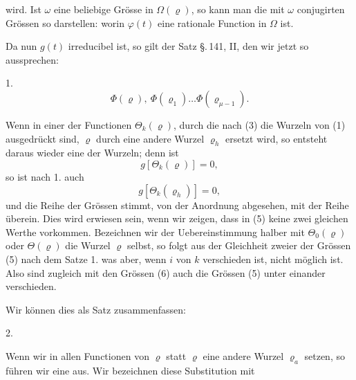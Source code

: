 
wird. Ist $\omega$ eine beliebige Grösse in $\Omega(\varrho)$, so kann man die mit $\omega$ conjugirten Grössen so darstellen:
worin $\varphi(t)$ eine rationale Function in $\Omega$ ist.

Da nun $g(t)$ irreducibel ist, so gilt der Satz \S.\,141, II, den wir jetzt so aussprechen:

1. 
\[
\Phi(\varrho),\ \Phi(\varrho_1) \ldots \Phi(\varrho_{\mu-1}).
\]

Wenn in einer der Functionen $\Theta_k(\varrho)$, durch die nach (3) die Wurzeln von (1) ausgedrückt sind, $\varrho$ durch eine andere Wurzel $\varrho_h$ ersetzt wird, so entsteht daraus wieder eine der Wurzeln; denn ist
\[
g[\Theta_k(\varrho)] = 0,
\]
so ist nach 1. auch
\[
g[\Theta_k(\varrho_h)] = 0,
\]
und die Reihe der Grössen
stimmt, von der Anordnung abgesehen, mit der Reihe
überein. Dies wird erwiesen sein, wenn wir zeigen, dass in (5) keine zwei gleichen Werthe vorkommen. Bezeichnen wir der Uebereinstimmung halber mit $\Theta_0(\varrho)$ oder $\Theta(\varrho)$ die Wurzel $\varrho$ selbst, so folgt aus der Gleichheit zweier der Grössen (5)
nach dem Satze 1.
was aber, wenn $i$ von $k$ verschieden ist, nicht möglich ist. Also sind zugleich mit den Grössen (6) auch die Grössen (5) unter einander verschieden.

Wir können dies als Satz zusammenfassen:

2. 

Wenn wir in allen Functionen von $\varrho$ statt $\varrho$ eine andere Wurzel $\varrho_a$ setzen, so führen wir eine  aus. Wir bezeichnen diese Substitution mit
